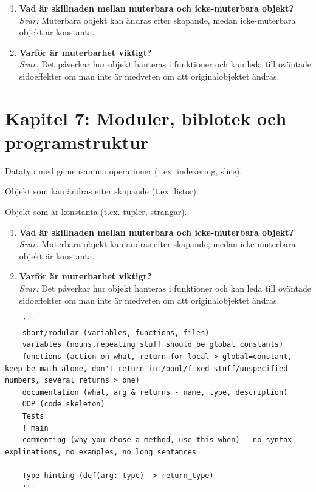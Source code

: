 \documentclass[11pt,a4paper]{article}
\begin{document}
\begin{enumerate}[label=\bfseries\color{primary}Fråga \arabic*:, leftmargin=1.8cm]
    \item \textbf{Vad är skillnaden mellan muterbara och icke-muterbara objekt?}
    \\ \textit{Svar:} Muterbara objekt kan ändras efter skapande, medan icke-muterbara objekt är konstanta.
    
    \item \textbf{Varför är muterbarhet viktigt?}
    \\ \textit{Svar:} Det påverkar hur objekt hanteras i funktioner och kan leda till oväntade sidoeffekter om man inte är medveten om att originalobjektet ändras.
\end{enumerate}

\section{Kapitel 7: Moduler, biblotek och programstruktur}

\begin{description}[style=nextline, leftmargin=1cm, labelindent=0.5cm]
    \item[\color{primary}Sekvenstyp] Datatyp med gemensamma operationer (t.ex. indexering, slice).
    \item[\color{primary}Muterbar] Objekt som kan ändras efter skapande (t.ex. listor).
    \item[\color{primary}Icke-muterbar] Objekt som är konstanta (t.ex. tupler, strängar).
\end{description}

\begin{enumerate}[label=\bfseries\color{primary}Fråga \arabic*:, leftmargin=1.8cm]
    \item \textbf{Vad är skillnaden mellan muterbara och icke-muterbara objekt?}
    \\ \textit{Svar:} Muterbara objekt kan ändras efter skapande, medan icke-muterbara objekt är konstanta.
    
    \item \textbf{Varför är muterbarhet viktigt?}
    \\ \textit{Svar:} Det påverkar hur objekt hanteras i funktioner och kan leda till oväntade sidoeffekter om man inte är medveten om att originalobjektet ändras.
\end{enumerate}

\begin{lstlisting}
    '''
    short/modular (variables, functions, files) 
    variables (nouns,repeating stuff should be global constants)
    functions (action on what, return for local > global=constant, keep be math alone, don't return int/bool/fixed stuff/unspecified numbers, several returns > one)
    documentation (what, arg & returns - name, type, description)
    OOP (code skeleton)
    Tests
    ! main
    commenting (why you chose a method, use this when) - no syntax explinations, no examples, no long sentances

    Type hinting (def(arg: type) -> return_type)
    '''
\end{lstlisting}
\end{document}
